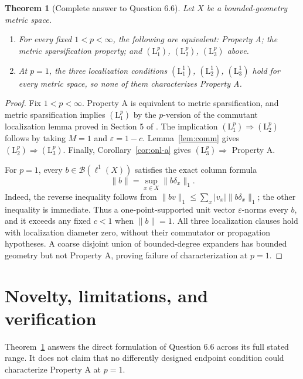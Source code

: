 \documentclass[11pt]{article}
\newtheorem{theorem}{Theorem}
\newcommand{\B}{\mathcal B}
\begin{document}
\begin{theorem}[Complete answer to Question 6.6]\label{thm:main}
Let $X$ be a bounded-geometry metric space.

\begin{enumerate}[label=\textup{(\roman*)}]
\item For every fixed $1<p<\infty$, the following are equivalent:
Property A; the metric sparsification property; and
$(\mathrm L_1^p)$, $(\mathrm L_2^p)$, $(\mathrm L_3^p)$ above.

\item At $p=1$, the three localization conditions
$(\mathrm L_1^1)$, $(\mathrm L_2^1)$, $(\mathrm L_3^1)$ hold for every metric
space, so none of them characterizes Property A.
\end{enumerate}
\end{theorem}

\begin{proof}
Fix $1<p<\infty$. Property A is equivalent to metric sparsification, and
metric sparsification implies $(\mathrm L_1^p)$ by the $p$-version of the
commutant localization lemma proved in Section 5 of \cite{SZ}. The implication
$(\mathrm L_1^p)\Rightarrow(\mathrm L_2^p)$ follows by taking
$M=1$ and $\varepsilon=1-c$. Lemma~\ref{lem:comm} gives
$(\mathrm L_2^p)\Rightarrow(\mathrm L_3^p)$. Finally,
Corollary~\ref{cor:onl-a} gives $(\mathrm L_3^p)\Rightarrow$ Property A.

For $p=1$, every $b\in\B(\ell^1(X))$ satisfies the exact column formula
\[
                 \|b\|=\sup_{x\in X}\|b\delta_x\|_1.
 \tag{10}
\]
Indeed, the reverse inequality follows from
$\|bv\|_1\le\sum_x|v_x|\|b\delta_x\|_1$; the other inequality is immediate.
Thus a one-point-supported unit vector $\varepsilon$-norms every $b$, and it
exceeds any fixed $c<1$ when $\|b\|=1$. All three localization clauses hold
with localization diameter zero, without their commutator or propagation
hypotheses. A coarse disjoint union of bounded-degree expanders has bounded
geometry but not Property A, proving failure of characterization at $p=1$.
\end{proof}

\section{Novelty, limitations, and verification}

Theorem~\ref{thm:main} answers the direct formulation of Question 6.6 across
its full stated range. It does not claim that no differently designed endpoint
condition could characterize Property A at $p=1$.
\end{document}
